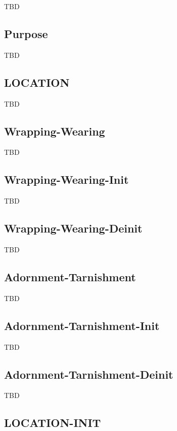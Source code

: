 \documentclass[a4paper]{article}
\newcommand{\fr}[1]{\textsf{#1}}
\begin{document}
TBD

\subsection{\fr{Purpose}}
\label{sec:Purpose}

TBD

\subsection{\fr{LOCATION}}
\label{sec:LOCATION}

TBD

\subsection{\fr{Wrapping-Wearing}}
\label{sec:Wrapping-Wearing}

TBD

\subsection{\fr{Wrapping-Wearing-Init}}
\label{sec:Wrapping-Wearing-Init}

TBD

\subsection{\fr{Wrapping-Wearing-Deinit}}
\label{sec:Wrapping-Wearing-Deinit}

TBD

\subsection{\fr{Adornment-Tarnishment}}
\label{sec:Adornment-Tarnishment}

TBD

\subsection{\fr{Adornment-Tarnishment-Init}}
\label{sec:Adornment-Tarnishment-Init}

TBD

\subsection{\fr{Adornment-Tarnishment-Deinit}}
\label{sec:Adornment-Tarnishment-Deinit}

TBD

\subsection{\fr{LOCATION-INIT}}
\label{sec:LOCATION-INIT}
\end{document}
